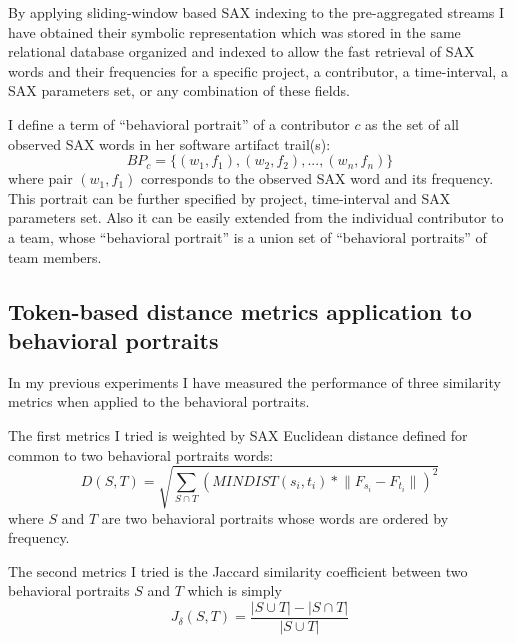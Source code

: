 \documentclass[conference]{worldcomp}
\begin{document}
By applying sliding-window based SAX indexing to the pre-aggregated streams I have obtained 
their symbolic representation which was stored in the same relational database organized and 
indexed to allow the fast retrieval of SAX words and their frequencies for a specific project, 
a contributor, a time-interval, a SAX parameters set, or any combination of these fields. 

I define a term of ``behavioral portrait'' of a contributor $c$ as the set of all observed SAX words 
in her software artifact trail(s):
\begin{equation}
 BP_{c} = \{ (w_{1},f_{1}), (w_{2},f_{2}), ..., (w_{n},f_{n}) \}
\end{equation}
where pair $(w_{1},f_{1})$ corresponds to the observed SAX word and its frequency. This portrait can
be further specified by project, time-interval and SAX parameters set. Also it can be easily extended 
from the individual contributor to a team, whose ``behavioral portrait'' is a union set
of ``behavioral portraits'' of team members.


\subsection{Token-based distance metrics application to behavioral portraits}
In my previous experiments I have measured the performance of three similarity metrics 
when applied to the behavioral portraits. 

The first metrics I tried is weighted by SAX Euclidean distance defined for common to two 
behavioral portraits words:
\begin{equation}
D(S,T) = \sqrt{ \sum_{S\cap T} (MINDIST(s_{i},t_{i}) * \lVert F_{s_{i}}-F_{t_{i}} \rVert )^{2}  }
\end{equation} 
where $S$ and $T$ are two behavioral portraits whose words are ordered by frequency.

The second metrics I tried is the Jaccard similarity coefficient between two behavioral portraits
$S$ and $T$ which is simply 
\begin{equation}
J_{\delta}(S,T) = \frac{|S\cup T| - |S\cap T|}{|S\cup T|}
\end{equation} 
\end{document}

